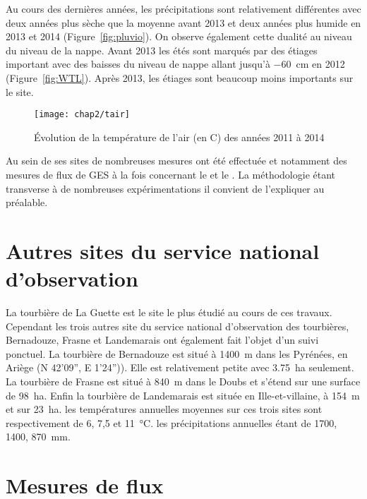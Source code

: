 Au cours des dernières années, les précipitations sont relativement différentes avec deux années plus sèche que la moyenne avant 2013 et deux années plus humide en 2013 et 2014 (Figure~\ref{fig:pluvio}).
On observe également cette dualité au niveau du niveau de la nappe.
Avant 2013 les étés sont marqués par des étiages important avec des baisses du niveau de nappe allant jusqu'à \SI{-60}{\cm} en 2012 (Figure~\ref{fig:WTL}).
Après 2013, les étiages sont beaucoup moins importants sur le site.



\begin{figure}
\centering
\texttt{[image: chap2/tair]}
\caption{Évolution de la température de l'air (en \textdegree C) des années 2011 à 2014}
\label{fig:tair}
\end{figure}



Au sein de ses sites de nombreuses mesures ont été effectuée et notamment des mesures de flux de GES à la fois concernant le \coo et le \chh. La méthodologie étant transverse à de nombreuses expérimentations il convient de l'expliquer au préalable.

\section{Autres sites du service national d'observation}

La tourbière de La Guette est le site le plus étudié au cours de ces travaux.
Cependant les trois autres site du service national d'observation des tourbières, Bernadouze, Frasne et Landemarais ont également fait l'objet d'un suivi ponctuel.
La tourbière de Bernadouze est situé à \SI{1400}{\metre} dans les Pyrénées, en Ariège (N 42’09”, E 1’24”)).
Elle est relativement petite avec \SI{3.75}{\hectare} seulement.
La tourbière de Frasne est situé à \SI{840}{\metre} dans le Doubs et s'étend sur une surface de \SI{98}{\hectare}.
Enfin la tourbière de Landemarais est située en Ille-et-villaine, à \SI{154}{\metre} et sur \SI{23}{\hectare}.
les températures annuelles moyennes sur ces trois sites sont respectivement de 6, 7,5 et \SI{11}{\degreeCelsius}.
les précipitations annuelles étant de \num{1700}, \num{1400}, \SI{870}{\milli\meter}.


\section{Mesures de flux}
\label{sec:clsd_chbr_method}


